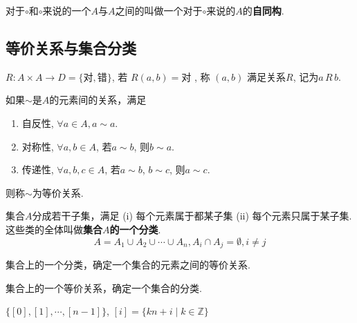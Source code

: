 \begin{Definition}[自同构]
对于$\circ$和$\circ$来说的一个$A$与$A$之间的\;\;叫做一个对于$\circ$来说的$A$的\textbf{自同构}.
\end{Definition}

\subsection{等价关系与集合分类}

\begin{Definition}[关系\mbox{[Relation]}]
$R: A \times A \rightarrow D = \{\text{对}, \text{错}\} $, 
若
$R(a, b) = \text{对}$
, 称
$(a, b)$
满足关系$R$, 记为$a \, R \, b$.
\end{Definition}

\begin{Definition}[等价关系]
如果$\sim$是$A$的元素间的关系，满足 
\begin{enumerate}[(1)]
\item 自反性, $\forall a \in A, a \sim a$.
\item 对称性, $\forall a, b \in A$, 若$a \sim b$, 则$b \sim a$.
\item 传递性, $\forall a, b, c \in A$, 若$a \sim b$, $b\sim c$, 则$a \sim c$.
\end{enumerate}
则称$\sim$为等价关系.
\end{Definition}

\begin{Definition}[集合分类、划分]
集合$A$分成若干子集，满足 (i) 每个元素属于都某子集 (ii) 每个元素只属于某子集. 这些类的全体叫做\textbf{集合$A$的一个分类}.
$$ A = A_1 \cup A_2 \cup \cdots \cup A_n, A_i \cap A_j = \emptyset, i \neq j$$
\end{Definition}

\begin{Theorem}
集合上的一个分类，确定一个集合的元素之间的等价关系.
\end{Theorem}

\begin{Theorem}
集合上的一个等价关系，确定一个集合的分类.
\end{Theorem}

\begin{Definition}[模$n$的剩余类]
$ \{ [0], [1], \cdots, [n-1] \} $, $[i] = \{ k n + i \mid k \in \mathbb{Z} \}$
\end{Definition}
